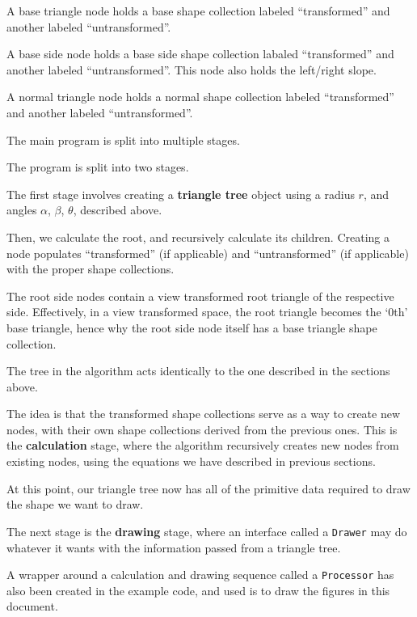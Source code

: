 \documentclass[a4paper,12pt]{article}
\theoremstyle{definition}
\theoremstyle{plain}
\begin{document}
	A base triangle node holds a base shape collection labeled ``transformed'' and another labeled ``untransformed''.

	A base side node holds a base side shape collection labaled ``transformed'' and another labeled ``untransformed''. This node also holds the left/right slope.
	
	A normal triangle node holds a normal shape collection labeled ``transformed'' and another labeled ``untransformed''.

	The main program is split into multiple stages.

	The program is split into two stages.

	The first stage involves creating a \textbf{triangle tree} object using a radius $r$, and angles
	$\alpha$, $\beta$, $\theta$, described above.

	Then, we calculate the root, and recursively calculate its children. Creating a node populates ``transformed'' (if applicable) and ``untransformed'' (if applicable) with the proper shape collections.
	
	The root side nodes contain a
	view transformed root triangle of the respective side. Effectively, in a view transformed space, the root triangle becomes the `0th' base triangle, hence why the root side node itself has a base triangle shape collection.

	The tree in the algorithm acts identically to the one described in the sections above.

	The idea is that the transformed shape collections serve as a way to create new nodes, with their own
	shape collections derived from the previous ones. This is the \textbf{calculation} stage, where the algorithm recursively creates new nodes from existing nodes, using the
	equations we have described in previous sections.

	At this point, our triangle tree now has all of the primitive data required to draw the shape we want to draw.

	The next stage is the \textbf{drawing} stage, where an interface called a \texttt{Drawer} may do whatever it wants
	with the information passed from a triangle tree.

	A wrapper around a calculation and drawing sequence called a \texttt{Processor} has also been created in the example code, and used is to draw the figures in this document.
\end{document}
